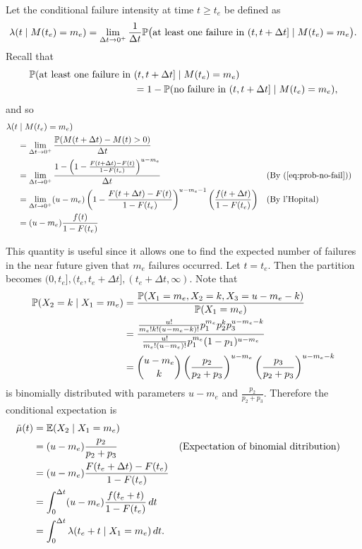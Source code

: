 Let the conditional failure intensity at time $t\geq t_e$ be defined as
$$
\lambda(t\mid M(t_e)=m_e)=\lim_{\Delta t \to 0^+}\frac{1}{\Delta t}\mathbb{P}\big(\text{at least one failure in }(t,t+\Delta t]\mid M(t_e)=m_e\big).
$$
Recall that
\begin{align*}
    \mathbb{P}(\text{at least one failure in } &(t, t+\Delta t] \; | \; M(t_e) = m_e) \\&= 1 - \mathbb{P}(\text{no failure in } (t, t+\Delta t] \; | \; M(t_e) = m_e), 
\end{align*}
and so
\begin{align*}
    \lambda(t&\mid M(t_e)=m_e)\\
    &=\lim_{\Delta t\to 0^+}\frac{\mathbb{P}(M(t+\Delta t)-M(t) > 0)}{\Delta t}\\
    &=\lim_{\Delta t\to 0^+}\frac{1-\left(1 - \frac{F(t+\Delta t) - F(t)}{1 - F(t_e)}\right)^{u-m_e}}{\Delta t}&&(\text{By (\ref{eq:prob-no-fail})})\\
    &=\lim_{\Delta t\to 0^+}(u-m_e)\left(1 - \frac{F(t+\Delta t) - F(t)}{1 - F(t_e)}\right)^{u-m_e-1}\left(\frac{f(t+\Delta t)}{1-F(t_e)}\right)&&(\text{By l'Hopital})\\
    &=(u-m_e)\frac{f(t)}{1-F(t_e)}
\end{align*}

This quantity is useful since it allows one to find the expected number of failures in the near future given that $m_e$ failures occurred. Let $t=t_e$. Then the partition becomes $(0,t_e], (t_e, t_e+\Delta t], (t_e+\Delta t, \infty)$. Note that
\begin{align*}
    \mathbb{P}(X_2=k\mid X_1=m_e)&=\frac{\mathbb{P}(X_1=m_e, X_2=k, X_3=u-m_e-k)}{\mathbb{P}(X_1=m_e)}\\
    &=\frac{\frac{u!}{m_e!k!(u-m_e-k)!}p_1^{m_e}p_2^k p_3^{u-m_e-k}}{\frac{u!}{m_e!(u-m_e)!}p_1^{m_e}(1-p_1)^{u-m_e}}\\
    &={u-m_e\choose k}\left(\frac{p_2}{p_2+p_3}\right)^{u-m_e}\left(\frac{p_3}{p_2+p_3}\right)^{u-m_e-k}
\end{align*}
is binomially distributed with parameters $u-m_e$ and $\frac{p_2}{p_2+p_3}$. Therefore the conditional expectation is
\begin{equation}\label{eq:conditional_expectation}
        \begin{aligned}
        \Tilde{\mu}(t)&=\mathbb{E}(X_2\mid X_1=m_e)\\
        &=(u-m_e)\frac{p_2}{p_2+p_3}&&(\text{Expectation of binomial ditribution})\\
        &=(u-m_e)\frac{F(t_e+\Delta t)-F(t_e)}{1-F(t_e)}\\
        &=\int_0^{\Delta t}(u-m_e)\frac{f(t_e+t)}{1-F(t_e)}\,dt\\
        &=\int_0^{\Delta t}\lambda(t_e+t\mid X_1=m_e)\,dt.
\end{aligned}
\end{equation}

